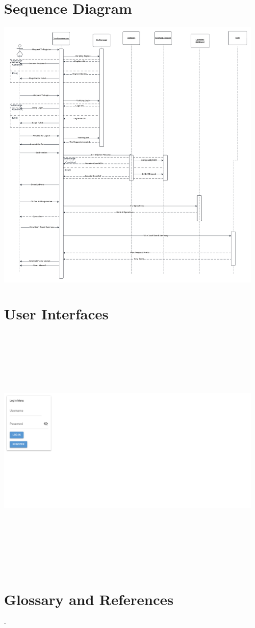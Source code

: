 \documentclass[a4paper,12pt]{report}
\begin{document}
	\section{Sequence Diagram}
	\begin{center}
		\includegraphics{Sequance Diagram (Large).png}
	\end{center}
	\section{User Interfaces}
		\includegraphics[width=780pt,height=360pt]{user_interface1.png} %
	\section{Glossary and References}
		-
\end{document}
